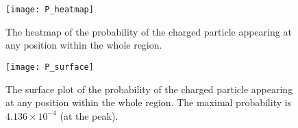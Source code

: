 \begin{figure}[!hbt]
    \centering
    \texttt{[image: P\_heatmap]}
    \caption{The heatmap of the probability of the charged particle appearing at any
        position within the whole region.}
    \label{fig:P_heatmap}
\end{figure}

\begin{figure}[!hbt]
    \centering
    \texttt{[image: P\_surface]}
    \caption{The surface plot of the probability of the charged particle appearing at any
        position within the whole region. The maximal probability is $4.136 \times 10^{-4}$
        (at the peak).}
    \label{fig:P_surface}
\end{figure}
